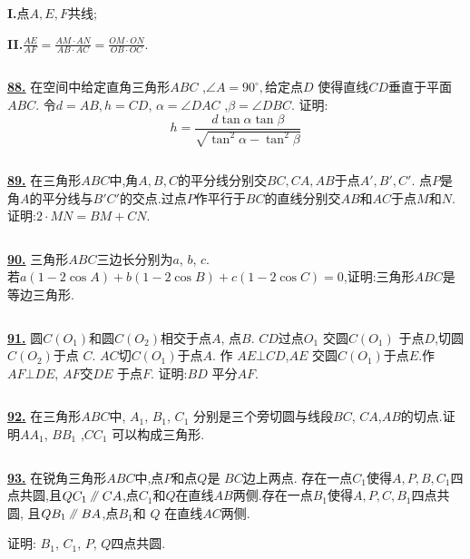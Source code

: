 \documentclass{article}
\newcommand\pxx{%
\mathrel{\text{\tikz[baseline] \draw (0em,-0.3ex) -- (.4em,1.7ex) (.2em,-0.3ex) -- (.6em,1.7ex);}%
}}
\begin{document}
{\bf I.}点$A,E,F$共线;

{\bf II.}$\displaystyle\frac{AE}{AF}=\frac{AM\cdot AN}{AB\cdot AC}=\frac{OM\cdot ON}{OB\cdot OC}$.

$$ $$

\href{ http://www.artofproblemsolving.com/Forum/viewtopic.php?p=310011#p310011
}{\bf 88.} 在空间中给定直角三角形$ABC$ ,$\angle A=90^{\circ},$给定点$D$ 使得直线$CD$垂直于平面$ABC.$ 令$d = AB, h = CD$, $\alpha=\angle DAC$ ,$\beta=\angle DBC$. 证明: $$ h=\frac{d\tan\alpha\tan\beta}{\sqrt{\tan^2\alpha-\tan^2\beta}}$$


$$ $$

\href{http://www.artofproblemsolving.com/Forum/viewtopic.php?p=311023#p311023
 }{\bf 89.} 在三角形$ABC$中,角$A, B, C$的平分线分别交$BC, CA, AB$于点$A', B', C'.$ 点$P$是角$A$的平分线与$B'C'$的交点.过点$P$作平行于$BC$的直线分别交$AB $和$AC$于点$M$和$N.$证明:$2\cdot MN = BM + CN$.

$$ $$


\href{http://www.artofproblemsolving.com/Forum/viewtopic.php?p=307795#p307795
 }{\bf 90.} 三角形$ABC$三边长分别为$a$, $b$, $c$.\\
若$a\left(1-2 \cos A\right)+b\left(1-2 \cos B\right)+c\left(1-2 \cos C\right) = 0$,证明:三角形$ABC$是等边三角形.

$$ $$


\href{ http://www.artofproblemsolving.com/Forum/viewtopic.php?p=376521#p376521
}{\bf 91.}  圆$C(O_1)$和圆$C(O_2)$相交于点$A$, 点$B$. $CD$过点$O_1$ 交圆$C(O_1)$ 于点$D$,切圆$C(O_2)$于点 $C$. $AC$切$C(O_1)$于点$A$. 作 $AE \bot CD$,$AE$ 交圆$C(O_1)$于点$E$.作$AF \bot DE$, $AF$交$DE$ 于点$F$. 证明:$BD$ 平分$AF$.

$$ $$

\href{http://www.artofproblemsolving.com/Forum/viewtopic.php?p=292643#p292643
 }{\bf 92.} 在三角形$ABC$中, $A_{1}$, $B_{1}$, $C_{1}$ 分别是三个旁切圆与线段$BC$, $CA$,$AB$的切点.证明$A A_{1}$, $B B_{1}$ ,$C C_{1}$ 可以构成三角形.

$$ $$


\href{http://www.artofproblemsolving.com/Forum/viewtopic.php?p=213011#p213011
 }{\bf 93.} 在锐角三角形$ABC$中,点$P$和点$Q$是 $BC$边上两点. 存在一点$C_{1}$使得$A,P,B,C_{1}$四点共圆,且$QC_{1}\pxx CA$,点$C_{1}$和$Q$在直线$AB$两侧.存在一点$B_{1}$使得$A,P,C,B_{1}$四点共圆, 且$QB_{1}\pxx BA$,点$B_{1}$和 $Q$ 在直线$AC$两侧.  

证明: $B_{1}$, $C_{1}$, $P$, $Q$四点共圆.

$$ $$
\end{document}
